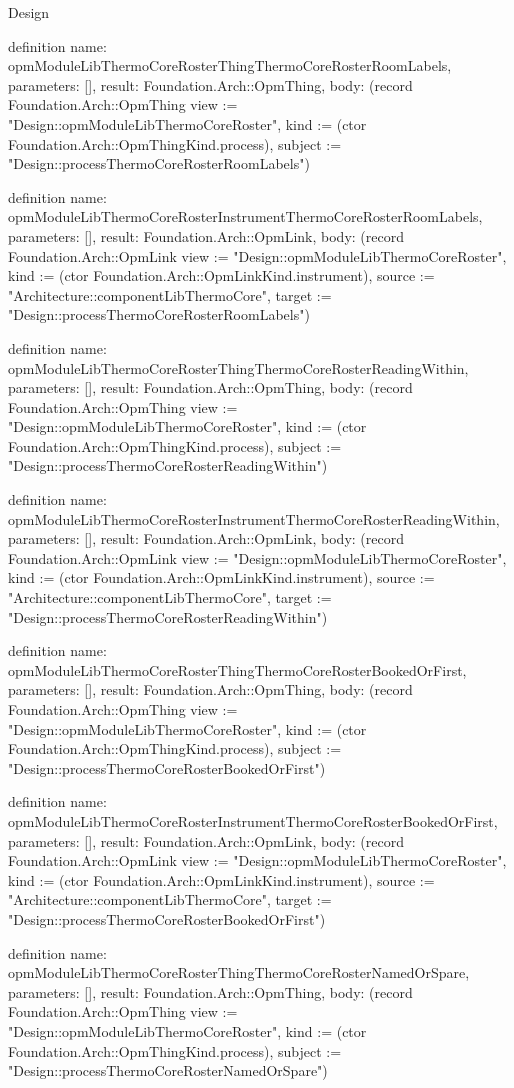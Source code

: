 \begin{lexlean}{Design}
\begin{semanticmodule}
definition{
  name: opmModuleLibThermoCoreRosterThingThermoCoreRosterRoomLabels,
  parameters: [],
  result: Foundation.Arch::OpmThing,
  body: (record Foundation.Arch::OpmThing {view := "Design::opmModuleLibThermoCoreRoster", kind := (ctor Foundation.Arch::OpmThingKind.process), subject := "Design::processThermoCoreRosterRoomLabels"})
}

definition{
  name: opmModuleLibThermoCoreRosterInstrumentThermoCoreRosterRoomLabels,
  parameters: [],
  result: Foundation.Arch::OpmLink,
  body: (record Foundation.Arch::OpmLink {view := "Design::opmModuleLibThermoCoreRoster", kind := (ctor Foundation.Arch::OpmLinkKind.instrument), source := "Architecture::componentLibThermoCore", target := "Design::processThermoCoreRosterRoomLabels"})
}

definition{
  name: opmModuleLibThermoCoreRosterThingThermoCoreRosterReadingWithin,
  parameters: [],
  result: Foundation.Arch::OpmThing,
  body: (record Foundation.Arch::OpmThing {view := "Design::opmModuleLibThermoCoreRoster", kind := (ctor Foundation.Arch::OpmThingKind.process), subject := "Design::processThermoCoreRosterReadingWithin"})
}

definition{
  name: opmModuleLibThermoCoreRosterInstrumentThermoCoreRosterReadingWithin,
  parameters: [],
  result: Foundation.Arch::OpmLink,
  body: (record Foundation.Arch::OpmLink {view := "Design::opmModuleLibThermoCoreRoster", kind := (ctor Foundation.Arch::OpmLinkKind.instrument), source := "Architecture::componentLibThermoCore", target := "Design::processThermoCoreRosterReadingWithin"})
}

definition{
  name: opmModuleLibThermoCoreRosterThingThermoCoreRosterBookedOrFirst,
  parameters: [],
  result: Foundation.Arch::OpmThing,
  body: (record Foundation.Arch::OpmThing {view := "Design::opmModuleLibThermoCoreRoster", kind := (ctor Foundation.Arch::OpmThingKind.process), subject := "Design::processThermoCoreRosterBookedOrFirst"})
}

definition{
  name: opmModuleLibThermoCoreRosterInstrumentThermoCoreRosterBookedOrFirst,
  parameters: [],
  result: Foundation.Arch::OpmLink,
  body: (record Foundation.Arch::OpmLink {view := "Design::opmModuleLibThermoCoreRoster", kind := (ctor Foundation.Arch::OpmLinkKind.instrument), source := "Architecture::componentLibThermoCore", target := "Design::processThermoCoreRosterBookedOrFirst"})
}

definition{
  name: opmModuleLibThermoCoreRosterThingThermoCoreRosterNamedOrSpare,
  parameters: [],
  result: Foundation.Arch::OpmThing,
  body: (record Foundation.Arch::OpmThing {view := "Design::opmModuleLibThermoCoreRoster", kind := (ctor Foundation.Arch::OpmThingKind.process), subject := "Design::processThermoCoreRosterNamedOrSpare"})
}


\end{semanticmodule}
\end{lexlean}
